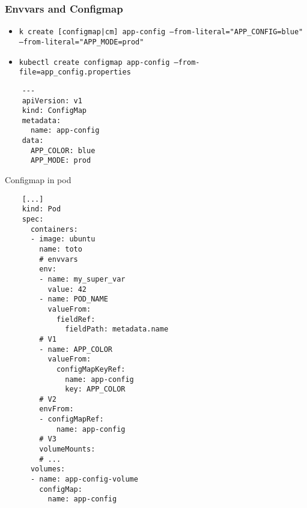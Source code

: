 
\subsubsection{Envvars and Configmap}
\begin{frame}[fragile]{\subsubsecname}
  \begin{itemize}
    \item \texttt{k create [configmap|cm] app-config --from-literal="APP\_CONFIG=blue" --from-literal="APP\_MODE=prod"}
    \item \texttt{kubectl create configmap app-config --from-file=app\_config.properties}
  \end{itemize}
  \begin{lstlisting}
    ---
    apiVersion: v1
    kind: ConfigMap
    metadata:
      name: app-config
    data:
      APP_COLOR: blue
      APP_MODE: prod
  \end{lstlisting}
\end{frame}

\begin{frame}[fragile]{Configmap in pod}
  \begin{lstlisting}
    [...]
    kind: Pod
    spec:
      containers:
      - image: ubuntu
        name: toto
        # envvars
        env:
        - name: my_super_var
          value: 42
        - name: POD_NAME
          valueFrom:
            fieldRef:
              fieldPath: metadata.name
        # V1
        - name: APP_COLOR
          valueFrom:
            configMapKeyRef:
              name: app-config
              key: APP_COLOR
        # V2
        envFrom:
        - configMapRef:
            name: app-config
        # V3
        volumeMounts:
        # ...
      volumes:
      - name: app-config-volume
        configMap:
          name: app-config
  \end{lstlisting}
\end{frame}
